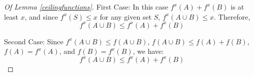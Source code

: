 \begin{proof}[Of Lemma \ref{ceilingfunctions}]
First Case: In this case $f^x(A) + f^x(B)$ is at least $x$, and since $f^x(S) \leq x$ for any given set $S$, $f^x(A \cup B) \leq x$. Therefore, 
$$f^x(A \cup B) \leq f^x(A) + f^x(B)$$

Second Case: Since $f^x(A \cup B) \leq f(A \cup B)$, $f(A \cup B) \leq f(A) + f(B)$, $f(A) = f^x(A)$, and $f(B) = f^x(B)$, we have:
$$f^x(A \cup B) \leq f^x(A) + f^x(B)$$
 
\end{proof}

\begin{comment}
\begin{proof}[Of Lemma \ref{submodularsefr}]
Suppose for the sake of contradiction that there is at least one item $b_j$ where $V_k(\{b_j\}) \geq 1/3$ for $a_k$. Now, let $T = \{a_k\}$, $S = \{b_j\}$, and $\mathcal{A} = \langle A_1, A_2, \ldots, A_n\rangle$ be an allocation of $S$ to agents of $T$ where $A_k = \{b_j\}$, and $A_i = \emptyset$ for any $i \neq k$. Since $V_k(\{b_j\}) \geq 1/3$ and $b_j$ is the only member of $A_k$, we have $V_k(A_k) \geq 1/3$. Therefore: 
\begin{equation}\label{hineq3} \forall \agent_i \in T \hspace{3cm} V_i(A_i) \geq 1/3  \end{equation} 

According to the definition of $\MMS$, any agent $a_i$ can allocate $\items$ to all $n$ agents in such a way that the value of each of these sets is at least $1$ for $a_i$. Since $|S| = 1$, the unique member of $S$ in of only one of these $n$ sets for each agent $a_i$. Therefore, any agent $a_i$ can divide $\items \setminus S$ to at least $n-1$ sets in order the value of each of these $n-1$ sets be at least one for $a_i$. Using allocation $A$:
\begin{equation}\label{hineq4} \forall \agent_i \notin T \hspace{1cm} \MMS_{V_i}^{n-|T|} (\items \setminus S)\geq 1  \end{equation} 

Inequalities \eqref{hineq3} and \eqref{hineq4} imply that the problem is $1/3$-reducible.
\end{proof}
\end{comment}
